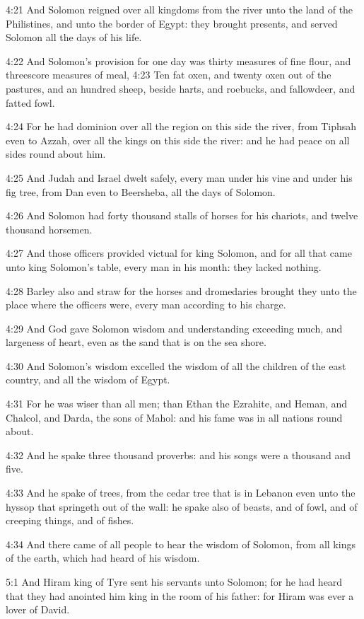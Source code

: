 4:21 And Solomon reigned over all kingdoms from the river unto the land of the Philistines, and unto the border of Egypt: they brought presents, and served Solomon all the days of his life.

4:22 And Solomon's provision for one day was thirty measures of fine flour, and threescore measures of meal, 4:23 Ten fat oxen, and twenty oxen out of the pastures, and an hundred sheep, beside harts, and roebucks, and fallowdeer, and fatted fowl.

4:24 For he had dominion over all the region on this side the river, from Tiphsah even to Azzah, over all the kings on this side the river: and he had peace on all sides round about him.

4:25 And Judah and Israel dwelt safely, every man under his vine and under his fig tree, from Dan even to Beersheba, all the days of Solomon.

4:26 And Solomon had forty thousand stalls of horses for his chariots, and twelve thousand horsemen.

4:27 And those officers provided victual for king Solomon, and for all that came unto king Solomon's table, every man in his month: they lacked nothing.

4:28 Barley also and straw for the horses and dromedaries brought they unto the place where the officers were, every man according to his charge.

4:29 And God gave Solomon wisdom and understanding exceeding much, and largeness of heart, even as the sand that is on the sea shore.

4:30 And Solomon's wisdom excelled the wisdom of all the children of the east country, and all the wisdom of Egypt.

4:31 For he was wiser than all men; than Ethan the Ezrahite, and Heman, and Chalcol, and Darda, the sons of Mahol: and his fame was in all nations round about.

4:32 And he spake three thousand proverbs: and his songs were a thousand and five.

4:33 And he spake of trees, from the cedar tree that is in Lebanon even unto the hyssop that springeth out of the wall: he spake also of beasts, and of fowl, and of creeping things, and of fishes.

4:34 And there came of all people to hear the wisdom of Solomon, from all kings of the earth, which had heard of his wisdom.

5:1 And Hiram king of Tyre sent his servants unto Solomon; for he had heard that they had anointed him king in the room of his father: for Hiram was ever a lover of David.

